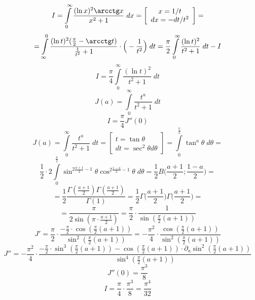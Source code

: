 


	$$I = \int \limits_0^{\infty} \frac{(\ln x)^2 \arcctg x}{x^2+1} \; dx = \left[\begin{array}{c}
		x = 1/t\\ dx = -dt/t^2 
	\end{array}\right] =$$
	$$=\int \limits_{\infty}^0 \frac{(\ln t)^2 (\frac{\pi}{2}-\arcctg t)}{\frac{1}{t^2}+1} \cdot \Big(-\frac{1}{t^2}\Big) \; dt = \frac{\pi}{2} \int \limits_0^{\infty} \frac{(\ln t)^2 }{t^2+1} \; dt - I$$
	$$I =\frac{\pi}{4} \int \limits_0^{\infty} \frac{(\ln t)^2 }{t^2+1} \; dt $$ 
	$$J(a) = \int \limits_0^{\infty} \frac{t^a }{t^2+1} \; dt $$
	$$I = \frac{\pi}{4} J''(0)$$
	$$J(a) = \int \limits_0^{\infty} \frac{t^a }{t^2+1} \; dt = \left[\begin{array}{c}
		t = \tan \theta \\ dt  = \sec^2 \theta d\theta 
	\end{array}\right] =\int \limits_0^{\frac{\pi}{2}} \tan^a \theta \; d\theta = $$
	$$\frac{1}{2} \cdot 2 \int \limits_0^{\frac{\pi}{2}} \sin^{2\frac{a+1}{2}-1} \theta \cos^{2\frac{1-a}{2}-1} \theta \; d\theta = \frac{1}{2} B\Big(\frac{a+1}{2}; \frac{1-a}{2}\Big)=$$
	$$= \frac{1}{2} \frac{\Gamma(\frac{a+1}{2}) \Gamma(\frac{a+1}{2})}{\Gamma(1)} = \frac{1}{2} \Gamma\Big(\frac{a+1}{2}\Big) \Gamma\Big(\frac{a+1}{2}\Big)=$$
	$$= \frac{\pi}{2 \sin (\pi \cdot \frac{a+1}{2})} = \frac{\pi}{2} \cdot \frac{1}{\sin (\frac{\pi}{2} (a+1))} $$
	$$J' = \frac{\pi}{2} \cdot \frac{-\frac{\pi}{2} \cdot \cos (\frac{\pi}{2} (a+1))}{\sin^2(\frac{\pi}{2} (a+1))} = -\frac{\pi^2}{4} \cdot \frac{\cos (\frac{\pi}{2} (a+1))}{\sin^2(\frac{\pi}{2} (a+1))}$$
	$$J'' = -\frac{\pi^2}{4} \cdot \frac{-\frac{\pi}{2} \cdot \sin^3 (\frac{\pi}{2} (a+1))-\cos(\frac{\pi}{2} (a+1)) \cdot \partial_a \sin^2 (\frac{\pi}{2} (a+1)) }{\sin^4 (\frac{\pi}{2} (a+1))}$$
	$$J''(0) = \frac{\pi^3}{8}$$
	$$I = \frac{\pi}{4} \cdot \frac{\pi^3}{8} = \frac{\pi^4}{32}$$
